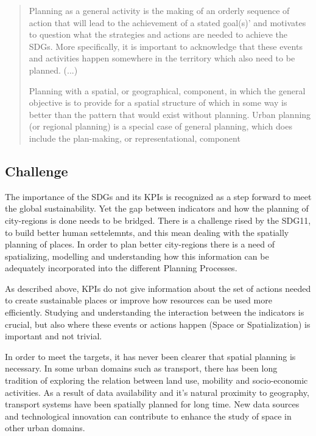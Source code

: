 \begin{quote}
    Planning as a general activity is the making of an orderly sequence of action that will lead to the achievement of a stated goal(s)’ and motivates to question what the strategies and actions are needed to achieve the SDGs. More specifically, it is important to acknowledge that these events and activities happen somewhere in the territory which also need to be planned. (...)\par
    Planning with a spatial, or geographical, component, in which the general objective is to provide for a spatial structure of which in some way is better than the pattern that would exist without planning. Urban planning (or regional planning) is a special case of general planning, which does include the plan-making, or representational, component
    
\end{quote}


\subsection{Challenge}
The importance of the SDGs and its KPIs is recognized as a step forward to meet the global sustainability. Yet the gap between indicators and how the planning of city-regions is done needs to be bridged. There is a challenge rised by the SDG11, to build better human settelemnts, and this mean dealing with the spatially planning of places. In order to plan better city-regions there is a need of spatializing, modelling and understanding  how this information can be adequately incorporated into the different Planning Processes. \par

As described above, KPIs do not give information about the set of actions needed to create sustainable places or improve how resources can be used more efficiently. Studying and understanding the interaction between the indicators is crucial, but also where these events or actions happen (Space or Spatialization) is important and not trivial. \par

In order to meet the targets, it has never been clearer that spatial planning is necessary. In some urban domains such as transport, there has been long tradition of exploring the relation between land use, mobility and socio-economic activities. As a result of data availability and it's natural proximity to geography, transport systems have been spatially planned for long time. New data sources and technological innovation can contribute to enhance the study of space in other urban domains.

